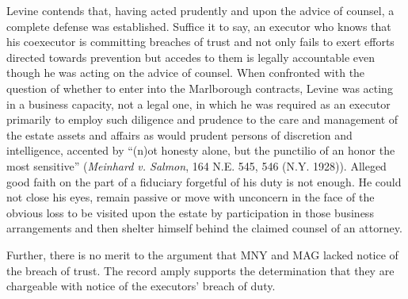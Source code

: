 Levine contends that, having acted prudently and upon the advice of counsel, a
complete defense was established. Suffice it to say, an executor who knows that
his coexecutor is committing breaches of trust and not only fails to exert
efforts directed towards prevention but accedes to them is legally accountable
even though he was acting on the advice of counsel. When confronted with the
question of whether to enter into the Marlborough contracts, Levine was acting
in a business capacity, not a legal one, in which he was required as an executor
primarily to employ such diligence and prudence to the care and management of
the estate assets and affairs as would prudent persons of discretion and
intelligence, accented by ``(n)ot honesty alone, but the punctilio of an honor
the most sensitive'' (\emph{Meinhard v. Salmon}, 164 N.E. 545, 546 (N.Y. 1928)).
Alleged good faith on the part of a fiduciary forgetful of his duty is not
enough. He could not close his eyes, remain passive or move with unconcern in
the face of the obvious loss to be visited upon the estate by participation in
those business arrangements and then shelter himself behind the claimed counsel
of an attorney.

Further, there is no merit to the argument that MNY and MAG lacked notice of the
breach of trust. The record amply supports the determination that they are
chargeable with notice of the executors' breach of duty.
